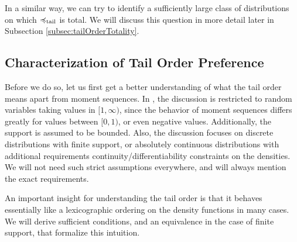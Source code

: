 \documentclass[a4paper]{scrreprt}
\theoremstyle{definition}
\begin{document}
    
    In a similar way, we can try to identify a sufficiently large class of distributions on which $\preccurlyeq_{\text{tail}}$ is total. We will discuss this question in more detail later in Subsection \ref{subsec:tailOrderTotality}.
    
    \subsection{Characterization of Tail Order Preference}
    Before we do so, let us first get a better understanding of what the tail order means apart from moment sequences.
    In \cite{bib:rassGameRiskManagI}, the discussion is restricted to random variables taking values in $[1, \infty)$, since the behavior of moment sequences differs greatly for values between $[0, 1)$, or even negative values. Additionally, the support is assumed to be bounded. Also, the discussion focuses on discrete distributions with finite support, or absolutely continuous distributions with additional requirements continuity/differentiability constraints on the densities.
    We will not need such strict assumptions everywhere, and will always mention the exact requirements.
    
    An important insight for understanding the tail order is that it behaves essentially like a lexicographic ordering on the density functions in many cases.
    We will derive sufficient conditions, and an equivalence in the case of finite support, that formalize this intuition.
    
\end{document}

